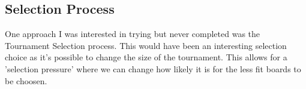 \documentclass[a4paper,11pt]{article}
\begin{document}
\subsection*{Selection Process}
One approach I was interested in trying but never completed was the Tournament Selection process. This would have been an interesting selection choice as it's possible to change the size of the tournament. This allows for a 'selection pressure' where we can change how likely it is for the less fit boards to be choosen.
\end{document}
